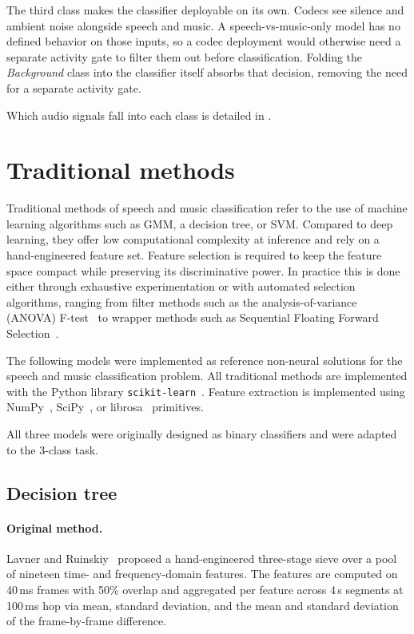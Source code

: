 The third class makes the classifier deployable on its own.
Codecs see silence and ambient noise alongside speech and music. A speech-vs-music-only model has no defined behavior on those inputs, so a codec deployment would otherwise need a separate activity gate to filter them out before classification.
Folding the \emph{Background} class into the classifier itself absorbs that decision, removing the need for a separate activity gate.

Which audio signals fall into each class is detailed in .

\section{Traditional methods}
\label{sec:traditional_methods}
Traditional methods of speech and music classification refer to the use of machine learning algorithms such as GMM, a decision tree, or SVM.
Compared to deep learning, they offer low computational complexity at inference and rely on a hand-engineered feature set.
Feature selection is required to keep the feature space compact while preserving its discriminative power.
In practice this is done either through exhaustive experimentation or with automated selection algorithms, ranging from filter methods such as the analysis-of-variance (ANOVA) F-test~\cite{guyon2003featsel} to wrapper methods such as Sequential Floating Forward Selection~\cite{pudil1994floating}.

The following models were implemented as reference non-neural solutions for the speech and music classification problem.
All traditional methods are implemented with the Python library \texttt{scikit-learn}~\cite{pedregosa2011sklearn}.
Feature extraction is implemented using NumPy~\cite{harris2020numpy}, SciPy~\cite{virtanen2020scipy}, or librosa~\cite{mcfee2015librosa} primitives.

All three models were originally designed as binary classifiers and were adapted to the 3-class task.

\subsection{Decision tree}

\paragraph{Original method.}
Lavner and Ruinskiy~\cite{lavner2009dt} proposed a hand-engineered three-stage sieve over a pool of nineteen time- and frequency-domain features.
The features are computed on 40\,ms frames with 50\% overlap and aggregated per feature across 4\,s segments at 100\,ms hop via mean, standard deviation, and the mean and standard deviation of the frame-by-frame difference.

